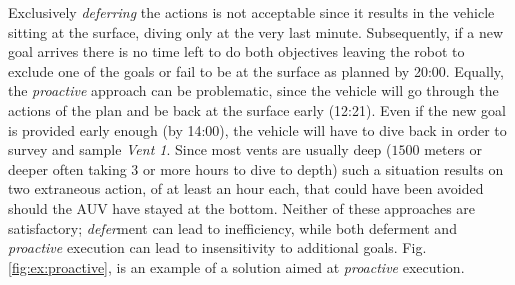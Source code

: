 


Exclusively {\em deferring} the actions is not acceptable since it
results in the vehicle sitting at the surface, diving only at the very
last minute. Subsequently, if a new goal arrives there is no time left
to do both objectives leaving the robot to exclude one of the goals or
fail to be at the surface as planned by 20:00. Equally, the {\em
  proactive} approach can be problematic, since the vehicle will go
through the actions of the plan and be back at the surface early
(12:21). Even if the new goal is provided early enough (by 14:00), the
vehicle will have to dive back in order to survey and sample {\em
  Vent 1}.
Since most vents are usually deep ($1500$ meters or deeper often
taking $3$ or more hours to dive to depth) such a situation results on
two extraneous action, of at least an hour each, that could have been
avoided should the AUV have stayed at the bottom.  Neither of these
approaches are satisfactory; {\em defer}ment can lead to inefficiency,
while both deferment and \emph{proactive} execution can lead to
insensitivity to additional goals.
Fig. \ref{fig:ex:proactive}, is an example of a solution aimed at
\emph{proactive} execution.

